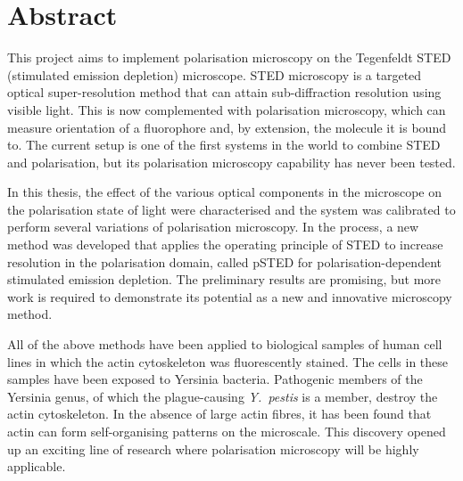 \chapter{Abstract}

This project aims to implement polarisation microscopy on the Tegenfeldt STED (stimulated emission depletion) microscope. STED microscopy is a targeted optical super-resolution method that can attain sub-diffraction resolution using visible light. This is now complemented with polarisation microscopy, which can measure   orientation of a fluorophore and, by extension, the molecule it is bound to. The current setup is one of the first systems in the world to combine STED and polarisation, but its polarisation microscopy capability has never been tested.

In this thesis, the effect of the various optical components in the microscope on the polarisation state of light were characterised and the system was calibrated to perform several variations of polarisation microscopy. In the process, a new method was developed that applies the operating principle of STED to increase resolution in the polarisation domain, called pSTED for polarisation-dependent stimulated emission depletion. The preliminary results are promising, but more work is required to demonstrate its potential as a new and innovative microscopy method.

All of the above methods have been applied to biological samples of human cell lines in which the actin cytoskeleton was fluorescently stained. The cells in these samples have been exposed to Yersinia bacteria. Pathogenic members of the Yersinia genus, of which the plague-causing \emph{Y.~pestis} is a member, destroy the actin cytoskeleton. In the absence of large actin fibres, it has been found that actin can form self-organising patterns on the microscale. This discovery opened up an exciting line of research where polarisation microscopy will be highly applicable.

